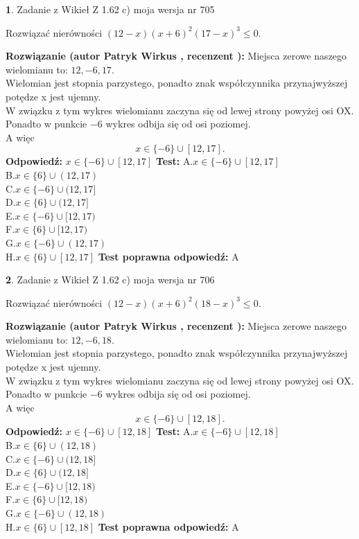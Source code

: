 \documentclass[12pt, a4paper]{article}
\theoremstyle{definition} %
\newtheorem{zad}{}
\newcommand{\zadStart}[1]{\begin{zad}#1\newline}
\newcommand{\zadStop}{\end{zad}}
\newcommand{\rozwStart}[2]{\noindent \textbf{Rozwiązanie (autor #1 , recenzent #2): }\newline}
\newcommand{\rozwStop}{\newline}
\newcommand{\odpStart}{\noindent \textbf{Odpowiedź:}\newline}
\newcommand{\odpStop}{\newline}
\newcommand{\testStart}{\noindent \textbf{Test:}\newline}
\newcommand{\testStop}{\newline}
\newcommand{\kluczStart}{\noindent \textbf{Test poprawna odpowiedź:}\newline}
\newcommand{\kluczStop}{\newline}
\begin{document}
\zadStart{Zadanie z Wikieł Z 1.62 c) moja wersja nr 705}

Rozwiązać nierówności $(12-x)(x+6)^{2}(17-x)^{3}\le0$.
\zadStop
\rozwStart{Patryk Wirkus}{}
Miejsca zerowe naszego wielomianu to: $12, -6, 17$.\\
Wielomian jest stopnia parzystego, ponadto znak współczynnika przy\linebreak najwyższej potędze x jest ujemny.\\ W związku z tym wykres wielomianu zaczyna się od lewej strony powyżej osi OX.\\
Ponadto w punkcie $-6$ wykres odbija się od osi poziomej.\\
A więc $$x \in \{-6\} \cup [12,17].$$
\rozwStop
\odpStart
$x \in \{-6\} \cup [12,17]$
\odpStop
\testStart
A.$x \in \{-6\} \cup [12,17]$\\
B.$x \in \{6\} \cup (12,17)$\\
C.$x \in \{-6\} \cup (12,17]$\\
D.$x \in \{6\} \cup (12,17]$\\
E.$x \in \{-6\} \cup [12,17)$\\
F.$x \in \{6\} \cup [12,17)$\\
G.$x \in \{-6\} \cup (12,17)$\\
H.$x \in \{6\} \cup [12,17]$
\testStop
\kluczStart
A
\kluczStop



\zadStart{Zadanie z Wikieł Z 1.62 c) moja wersja nr 706}

Rozwiązać nierówności $(12-x)(x+6)^{2}(18-x)^{3}\le0$.
\zadStop
\rozwStart{Patryk Wirkus}{}
Miejsca zerowe naszego wielomianu to: $12, -6, 18$.\\
Wielomian jest stopnia parzystego, ponadto znak współczynnika przy\linebreak najwyższej potędze x jest ujemny.\\ W związku z tym wykres wielomianu zaczyna się od lewej strony powyżej osi OX.\\
Ponadto w punkcie $-6$ wykres odbija się od osi poziomej.\\
A więc $$x \in \{-6\} \cup [12,18].$$
\rozwStop
\odpStart
$x \in \{-6\} \cup [12,18]$
\odpStop
\testStart
A.$x \in \{-6\} \cup [12,18]$\\
B.$x \in \{6\} \cup (12,18)$\\
C.$x \in \{-6\} \cup (12,18]$\\
D.$x \in \{6\} \cup (12,18]$\\
E.$x \in \{-6\} \cup [12,18)$\\
F.$x \in \{6\} \cup [12,18)$\\
G.$x \in \{-6\} \cup (12,18)$\\
H.$x \in \{6\} \cup [12,18]$
\testStop
\kluczStart
A
\kluczStop
\end{document}
